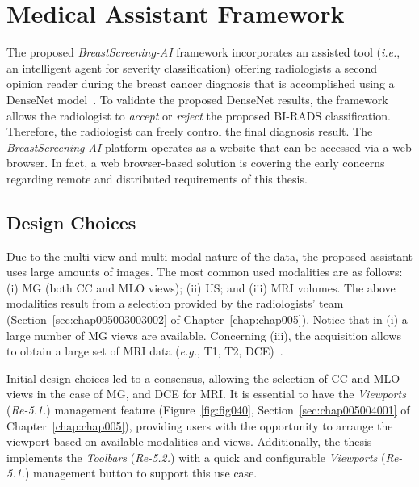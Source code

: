 \section{Medical Assistant Framework}
\label{sec:app003003}

The proposed {\it BreastScreening-AI} framework incorporates an assisted tool ({\it i.e.}, an intelligent agent for severity classification) offering radiologists a second opinion reader during the breast cancer diagnosis that is accomplished  using  a DenseNet model~\cite{chen2019learning}.
To validate the proposed DenseNet results, the framework allows the radiologist to {\it accept} or {\it reject} the proposed \ac{BI-RADS} classification.
Therefore, the radiologist can freely control the final diagnosis result.
The {\it BreastScreening-AI} platform operates as a website that can be accessed via a web browser.
In fact, a web browser-based solution is covering the early concerns regarding remote and distributed requirements of this thesis.

\subsection{Design Choices}
\label{sec:app003003001}

Due to the multi-view and multi-modal nature of the data, the proposed assistant uses large amounts of images.
The most common used modalities are as follows:
(i) \ac{MG} (both \ac{CC} and \ac{MLO} views);
(ii) \ac{US}; and
(iii) \ac{MRI} volumes.
The above modalities result from a selection provided by the radiologists' team (Section~\ref{sec:chap005003003002} of Chapter~\ref{chap:chap005}).
Notice that in (i) a large number of \ac{MG} views are available.
Concerning (iii), the acquisition allows to obtain a large set of \ac{MRI} data ({\it e.g.}, T1, T2, \ac{DCE})~\cite{seifabadi2019correlation}.

\textcolor{revised}{Initial design choices led to a consensus, allowing the selection of \ac{CC} and \ac{MLO} views in the case of \ac{MG}, and \ac{DCE} for \ac{MRI}.
It is essential to have the {\it Viewports} ({\it Re-5.1.}) management feature \textcolor{revised}{(Figure~\ref{fig:fig040}, Section~\ref{sec:chap005004001} of Chapter~\ref{chap:chap005})}, providing users with the opportunity to arrange the viewport based on available modalities and views.
Additionally, the thesis implements the {\it Toolbars} ({\it Re-5.2.}) with a quick and configurable {\it Viewports} ({\it Re-5.1.}) management button to support this use case.}

